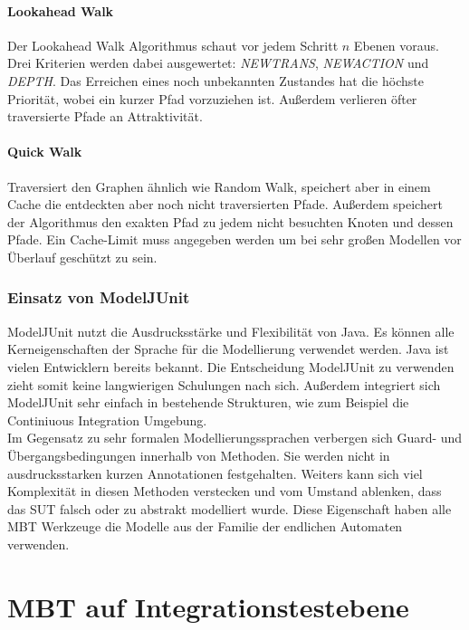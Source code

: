 \paragraph{Lookahead Walk}
Der Lookahead Walk Algorithmus schaut vor jedem Schritt $n$ Ebenen voraus. Drei Kriterien werden dabei ausgewertet: \textit{NEWTRANS}, \textit{NEWACTION} und \textit{DEPTH}. Das Erreichen eines noch unbekannten Zustandes hat die höchste Priorität, wobei ein kurzer Pfad vorzuziehen ist. Außerdem verlieren öfter traversierte Pfade an Attraktivität.

\paragraph{Quick Walk}
Traversiert den Graphen ähnlich wie Random Walk, speichert aber in einem Cache die entdeckten aber noch nicht traversierten Pfade. Außerdem speichert der Algorithmus den exakten Pfad zu jedem nicht besuchten Knoten und dessen Pfade. Ein Cache-Limit muss angegeben werden um bei sehr großen Modellen vor Überlauf geschützt zu sein.

\subsubsection{Einsatz von ModelJUnit}
ModelJUnit nutzt die Ausdrucksstärke und Flexibilität von Java. Es können alle Kerneigenschaften der Sprache für die Modellierung verwendet werden. Java ist vielen Entwicklern bereits bekannt. Die Entscheidung ModelJUnit zu verwenden zieht somit keine langwierigen Schulungen nach sich. Außerdem integriert sich ModelJUnit sehr einfach in bestehende Strukturen, wie zum Beispiel die Continiuous Integration Umgebung.\\
Im Gegensatz zu sehr formalen Modellierungssprachen verbergen sich Guard- und Übergangsbedingungen innerhalb von Methoden. Sie werden nicht in ausdrucksstarken kurzen Annotationen festgehalten. Weiters kann sich viel Komplexität in diesen Methoden verstecken und vom Umstand ablenken, dass das \Gls{SUT} falsch oder zu abstrakt modelliert wurde. Diese Eigenschaft haben alle \Gls{MBT} Werkzeuge die Modelle aus der Familie der endlichen Automaten verwenden.

\section{MBT auf Integrationstestebene}
\label{sec:mbt_integration}

